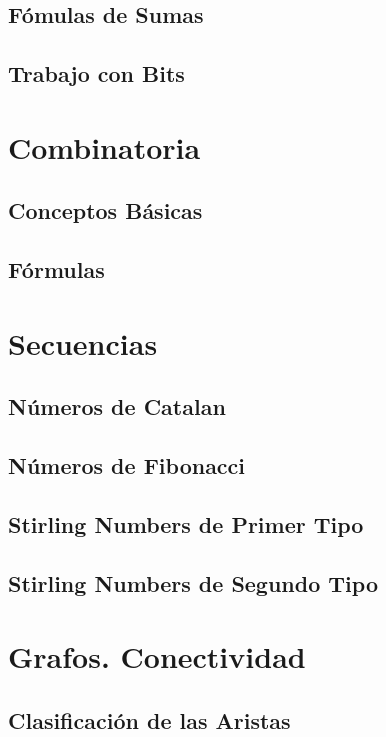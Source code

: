 	\subsection{F\'omulas de Sumas}
		
	\subsection{Trabajo con Bits}
	    

\section{Combinatoria}
	\subsection{Conceptos B\'asicas}
		
	\subsection{F\'ormulas}
		
		
\section{Secuencias}
	\subsection{N\'umeros de Catalan}
		
	\subsection{N\'umeros de Fibonacci}
			
	\subsection{Stirling Numbers de Primer Tipo}
			
	\subsection{Stirling Numbers de Segundo Tipo}
			
			
\section{Grafos. Conectividad}
	\subsection{Clasificaci\'on de las Aristas}
		
